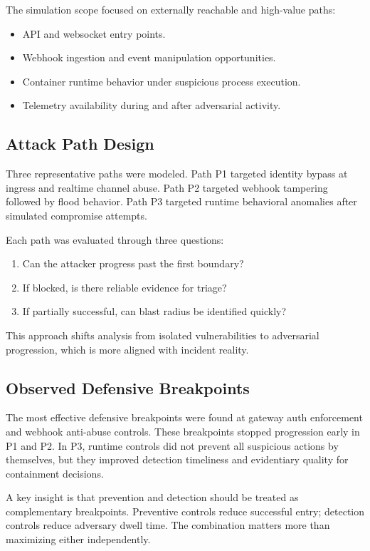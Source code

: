 \documentclass[conference]{IEEEtran}
\begin{document}
The simulation scope focused on externally reachable and high-value paths:
\begin{itemize}
\item API and websocket entry points.
\item Webhook ingestion and event manipulation opportunities.
\item Container runtime behavior under suspicious process execution.
\item Telemetry availability during and after adversarial activity.
\end{itemize}

\subsection{Attack Path Design}
Three representative paths were modeled. Path P1 targeted identity bypass at ingress and realtime channel abuse. Path P2 targeted webhook tampering followed by flood behavior. Path P3 targeted runtime behavioral anomalies after simulated compromise attempts.

Each path was evaluated through three questions:
\begin{enumerate}
\item Can the attacker progress past the first boundary?
\item If blocked, is there reliable evidence for triage?
\item If partially successful, can blast radius be identified quickly?
\end{enumerate}

This approach shifts analysis from isolated vulnerabilities to adversarial progression, which is more aligned with incident reality.

\subsection{Observed Defensive Breakpoints}
The most effective defensive breakpoints were found at gateway auth enforcement and webhook anti-abuse controls. These breakpoints stopped progression early in P1 and P2. In P3, runtime controls did not prevent all suspicious actions by themselves, but they improved detection timeliness and evidentiary quality for containment decisions.

A key insight is that prevention and detection should be treated as complementary breakpoints. Preventive controls reduce successful entry; detection controls reduce adversary dwell time. The combination matters more than maximizing either independently.
\end{document}
